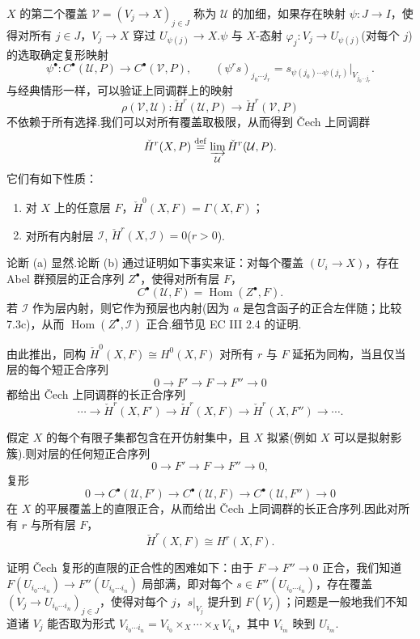 $X$ 的第二个覆盖 $\mathcal{V} = (V_j \to X)_{j \in J}$ 称为 $\mathcal{U}$ 的加细，如果存在映射 $\psi \colon J \to I$，使得对所有 $j \in J$，$V_j \to X$ 穿过 $U_{\psi(j)} \to X$.$\psi$ 与 $X$-态射 $\varphi_j \colon V_j \to U_{\psi(j)}$(对每个 $j$)的选取确定复形映射
\[
\psi^{\bullet} \colon C^{\bullet}(\mathcal{U}, P) \to C^{\bullet}(\mathcal{V}, P), \qquad (\psi^{r}s)_{j_0 \cdots j_r} = s_{\psi(j_0) \cdots \psi(j_r)}|_{V_{j_0 \cdots j_r}}.
\]
与经典情形一样，可以验证上同调群上的映射
\[
\rho(\mathcal{V}, \mathcal{U}) \colon \check{H}^{r}(\mathcal{U}, P) \to \check{H}^{r}(\mathcal{V}, P)
\]
不依赖于所有选择.我们可以对所有覆盖取极限，从而得到 \v{C}ech 上同调群
\[
\check{H}^{r}(X, P) \overset{\mathrm{def}}{=} \varinjlim_{\mathcal{U}} \check{H}^{r}(\mathcal{U}, P).
\]
它们有如下性质：
\begin{enumerate}
  \item 对 $X$ 上的任意层 $F$，$\check{H}^{0}(X, F) = \Gamma(X, F)$；
  \item 对所有内射层 $\mathcal{I}$, $\check{H}^{r}(X, \mathcal{I}) = 0$($r > 0$).
\end{enumerate}
论断 (a) 显然.论断 (b) 通过证明如下事实来证：对每个覆盖 $(U_i \to X)$，存在 Abel 群预层的正合序列 $Z^{\bullet}$，使得对所有层 $F$，
\[
C^{\bullet}(\mathcal{U}, F) = \operatorname{Hom}(Z^{\bullet}, F).
\]
若 $\mathcal{I}$ 作为层内射，则它作为预层也内射(因为 $a$ 是包含函子的正合左伴随；比较 7.3c)，从而 $\operatorname{Hom}(Z^{\bullet}, \mathcal{I})$ 正合.细节见 EC III 2.4 的证明.

由此推出，同构 $\check{H}^{0}(X, F) \cong H^{0}(X, F)$ 对所有 $r$ 与 $F$ 延拓为同构，当且仅当层的每个短正合序列
\[
0 \to F' \to F \to F'' \to 0
\]
都给出 \v{C}ech 上同调群的长正合序列
\[
\cdots \to \check{H}^{r}(X, F') \to \check{H}^{r}(X, F) \to \check{H}^{r}(X, F'') \to \cdots.
\]

\begin{theorem}\label{thm:10.2}
假定 $X$ 的每个有限子集都包含在开仿射集中，且 $X$ 拟紧(例如 $X$ 可以是拟射影簇).则对层的任何短正合序列
\[
0 \to F' \to F \to F'' \to 0,
\]
复形
\[
0 \to C^{\bullet}(\mathcal{U}, F') \to C^{\bullet}(\mathcal{U}, F) \to C^{\bullet}(\mathcal{U}, F'') \to 0
\]
在 $X$ 的平展覆盖上的直限正合，从而给出 \v{C}ech 上同调群的长正合序列.因此对所有 $r$ 与所有层 $F$，
\[
\check{H}^{r}(X, F) \cong H^{r}(X, F).
\]
\end{theorem}

证明 \v{C}ech 复形的直限的正合性的困难如下：由于 $F \to F'' \to 0$ 正合，我们知道 $F(U_{i_0 \cdots i_n}) \to F''(U_{i_0 \cdots i_n})$ 局部满，即对每个 $s \in F''(U_{i_0 \cdots i_n})$，存在覆盖 $(V_j \to U_{i_0 \cdots i_n})_{j \in J}$，使得对每个 $j$，$s|_{V_j}$ 提升到 $F(V_j)$；问题是一般地我们不知道诸 $V_j$ 能否取为形式 $V_{i_0 \cdots i_n} = V_{i_0} \times_{X} \cdots \times_{X} V_{i_n}$，其中 $V_{i_m}$ 映到 $U_{i_m}$.

